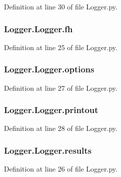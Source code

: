 Definition at line 30 of file Logger.\-py.

\hypertarget{class_logger_1_1_logger_a68875fbff44820c122a69fee38bad238}{
\subsubsection[{fh}]{\setlength{\rightskip}{0pt plus 5cm}Logger.\-Logger.\-fh}}\label{class_logger_1_1_logger_a68875fbff44820c122a69fee38bad238}


Definition at line 25 of file Logger.\-py.

\hypertarget{class_logger_1_1_logger_a8e881dc46a69491fab52e8fca3d8dd59}{
\subsubsection[{options}]{\setlength{\rightskip}{0pt plus 5cm}Logger.\-Logger.\-options}}\label{class_logger_1_1_logger_a8e881dc46a69491fab52e8fca3d8dd59}


Definition at line 27 of file Logger.\-py.

\hypertarget{class_logger_1_1_logger_abd7bd77ec56ae98c25ff4596ae8ee0ea}{
\subsubsection[{printout}]{\setlength{\rightskip}{0pt plus 5cm}Logger.\-Logger.\-printout}}\label{class_logger_1_1_logger_abd7bd77ec56ae98c25ff4596ae8ee0ea}


Definition at line 28 of file Logger.\-py.

\hypertarget{class_logger_1_1_logger_accc7402a4ee718e807f3f60d850d2072}{
\subsubsection[{results}]{\setlength{\rightskip}{0pt plus 5cm}Logger.\-Logger.\-results}}\label{class_logger_1_1_logger_accc7402a4ee718e807f3f60d850d2072}


Definition at line 26 of file Logger.\-py.

